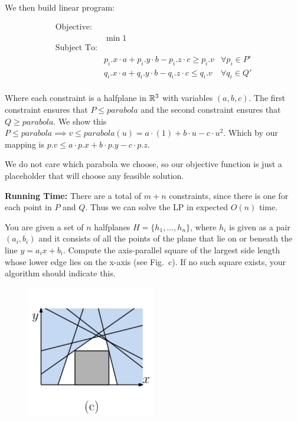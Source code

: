 \documentclass[11pt]{article}
\begin{document}
We then build linear program:

\begin{align*}
  \text{Objective: }\, & & \\
  & \min 1 & \\
  \text{Subject To:} & & \\
  & p_i.x \cdot a + p_i.y \cdot b - p_i.z \cdot c \geq p_i.v & \forall p_i \in P' \\
  & q_i.x \cdot a + q_i.y \cdot b - q_i.z \cdot c \leq q_i.v & \forall q_i \in Q' \\
\end{align*}

Where each constraint is a halfplane in $\mathbb{R}^3$ with variables $(a,b,c)$. 
The first constraint ensures that $P \leq parabola$ and the second constraint ensures 
that $Q \geq parabola$. We show this $P \leq parabola \implies v \leq parabola(u) = a \cdot (1) + b \cdot u - c \cdot u^2$.
Which by our mapping is $p.v \leq a \cdot p.x + b \cdot p.y - c \cdot p.z$.

We do not care which parabola we choose, so our objective function is just a placeholder
that will choose any feasible solution. 

\textbf{Running Time:} There are a total of $m + n$ constraints, since there is one for each point in $P$ and $Q$.
Thus we can solve the LP in expected $O(n)$ time.


You are given a set of $n$ halfplanes $H = \{h_1,\ldots,h_n\}$, where
$h_i$ is given as a pair $(a_i,b_i)$ and it consists of all the points
of the plane that lie on or beneath the line $y = a_ix + b_i$. Compute
the axis-parallel square of the largest side length whose lower edge
lies on the x-axis (see Fig.~c). If no such square exists, your
algorithm should indicate this.

\begin{figure}[h]
  \centering
  \includegraphics[width = 0.5\textwidth]{lp_c.png}
\end{figure}
\end{document}
